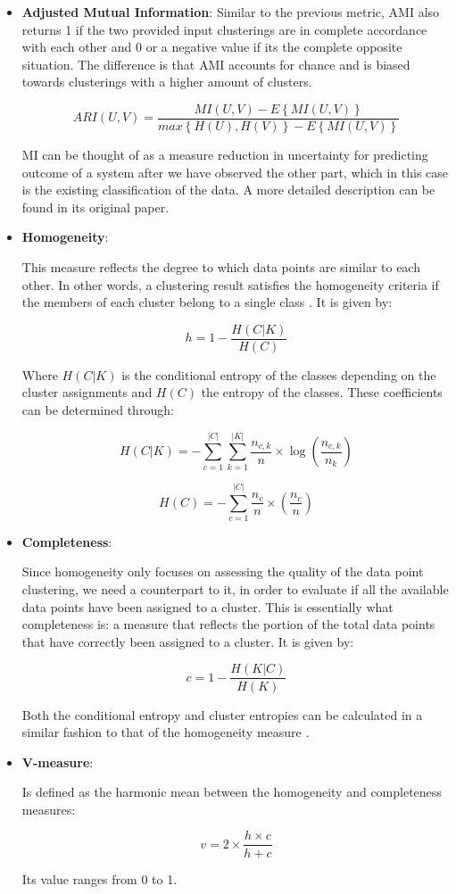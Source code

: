 \begin{itemize}

\medskip
\item \textbf{Adjusted Mutual Information}: Similar to the previous metric, AMI also returns 1 if the two provided input clusterings are in complete accordance with each other and 0 or a negative value if its the complete opposite situation. The difference is that AMI accounts for chance and is biased towards clusterings with a higher amount of clusters.

$$ARI(U,V) = \frac{MI(U,V)-E\left\{ MI(U,V) \right\}}{max \left\{ H(U),H(V) \right\} - E\left\{ MI(U,V) \right\}}$$

MI can be thought of as a measure reduction in uncertainty for predicting outcome of a system after we have observed the other part, which in this case is the existing classification of the data. A more detailed description can be found in its original paper. \cite{vinh2010information} \cite{scikitlearn}

\medskip
\item \textbf{Homogeneity}: 
 
This measure reflects the degree to which data points are similar to each other. In other words, a clustering result satisfies the homogeneity criteria if the members of each cluster belong to a single class \cite{rosenberg2007v} \cite{scikitlearn}. It is given by:

$$h = 1 - \frac{H(C|K)}{H(C)}$$

Where $H(C|K)$ is the conditional entropy of the classes depending on the cluster assignments and $H(C)$ the entropy of the classes. These coefficients can be determined through:
 
$$H(C|K) = - \sum_{c=1}^{|C|} \sum_{k=1}^{|K|} \frac{n_{c,k}}{n} \times \log \left( \frac{n_{c,k}}{n_k} \right)$$
 
$$H(C) = - \sum_{c=1}^{|C|} \frac{n_c}{n} \times \left( \frac{n_{c}}{n} \right)$$
 

\medskip 
\item \textbf{Completeness}:
 
Since homogeneity only focuses on assessing the quality of the data point clustering, we need a counterpart to it, in order to evaluate if all the available data points have been assigned to a cluster. This is essentially what completeness is: a measure that reflects the portion of the total data points that have correctly been assigned to a cluster. It is given by:

$$c = 1 - \frac{H(K|C)}{H(K)}$$

Both the conditional entropy and cluster entropies can be calculated in a similar fashion to that of the homogeneity measure \cite{rosenberg2007v} \cite{scikitlearn}.

\medskip
\item \textbf{V-measure}: 

Is defined as the harmonic mean between the homogeneity and completeness measures:

$$v = 2 \times \frac{h \times c}{h + c}$$

Its value ranges from 0 to 1. \cite{rosenberg2007v} \cite{scikitlearn} 

\end{itemize}
 
